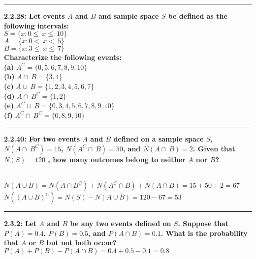 \documentclass[11pt]{article}
\newcommand\question[2]{\vspace{.25in}\hrule\textbf{#1: #2}}
\renewcommand\part[1]{\vspace{.10in}\textbf{(#1)}}
\begin{document}
\question{2.2.28}{Let events $A$ and $B$ and sample space $S$ 
    be defined as the following intervals: \\
$S = \{x: 0 \leq\ x\leq\ 10\}$ \\
$A = \{x: 0 <\ x <\ 5\}$ \\
$B = \{x: 3 \leq\ x\leq\ 7\}$ \\
Characterize the following events:}
\\ \part{a} {$A^C = \{0,5,6,7,8,9,10\}$}
\\ \part{b} {$A \cap\ B = \{3,4\}$}
\\ \part{c} {$A \cup\ B = \{1,2,3,4,5,6,7\}$}
\\ \part{d} {$A \cap\ B^C = \{1,2\}$}
\\ \part{e} {$A^C \cup\ B = \{0,3,4,5,6,7,8,9,10\}$}
\\ \part{f} {$A^C \cap\ B^C = \{0,8,9,10\}$}


\question{2.2.40}{For two events $A$ and $B$ defined on a sample
    space $S$,  
    $N (A \cap\ B^{C} )=15$, 
    $N (A^C \cap\ B)=50$, and
    $N (A \cap\ B)=2$. 
    Given that 
    $N(S)=120$
, how many outcomes belong to neither $A$ nor $B$?}

\\ $N(A \cup B) = N(A \cap B^C) + N(A^C \cap B) + N(A \cap B) = 15 + 50 + 2 = 67$
\\ $N((A \cup B)^{C}) = N(S) - N(A \cup B) = 120 - 67 = 53$


    \question{2.3.2}{Let $A$ and $B$ be any two events defined on
    $S$. Suppose that $P(A)=0.4$, $P(B)=0.5$, and $P(A \cap B)=0.1$.
What is the probability that $A$ or $B$ but not both occur?}
\\ $P(A) + P(B) - P(A \cap B) = 0.4 + 0.5 - 0.1 = 0.8$
\end{document}
